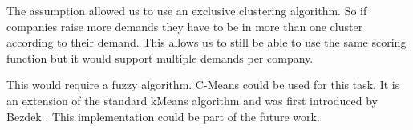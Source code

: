 The assumption allowed us to use an exclusive clustering algorithm. So if companies raise more demands they have
to be in more than one cluster according to their demand. This allows us to still be able to use the same scoring function
but it would support multiple demands per company.

This would require a fuzzy algorithm. C-Means could be used for this task. It is an extension of the standard kMeans
algorithm and was first introduced by Bezdek \cite{fuzzyClustering}. This implementation could be part of the future work.






















